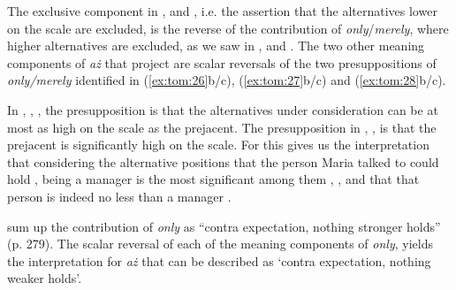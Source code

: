 \documentclass[output=paper,colorlinks,citecolor=brown]{langscibook}
\begin{document}

\noindent The exclusive component in ,  and , i.e. the assertion that the alternatives lower on the scale are excluded, is the reverse of the contribution of \textit{only}/\textit{merely}, where higher alternatives are excluded, as we saw in ,  and . The two other meaning components of \textit{aż} that project are scalar reversals of the two presuppositions of \textit{only/merely} identified in (\ref{ex:tom:26}b/c), (\ref{ex:tom:27}b/c) and (\ref{ex:tom:28}b/c).



In , , , the presupposition is that the alternatives under consideration can be at most as high on the scale as the prejacent. The presupposition in , ,  is that the prejacent is significantly high on the scale. For  this gives us the interpretation that considering the alternative positions that the person Maria talked to could hold , being a manager is the most significant among them , , and that that person is indeed no less than a manager .

\citet{beaverclark08} sum up the contribution of \textit{only} as “contra expectation, nothing stronger holds” (p. 279). The scalar reversal of each of the meaning components of \textit{only}, yields the interpretation for \textit{aż} that can be described as `contra expectation, nothing weaker holds'.
\end{document}
